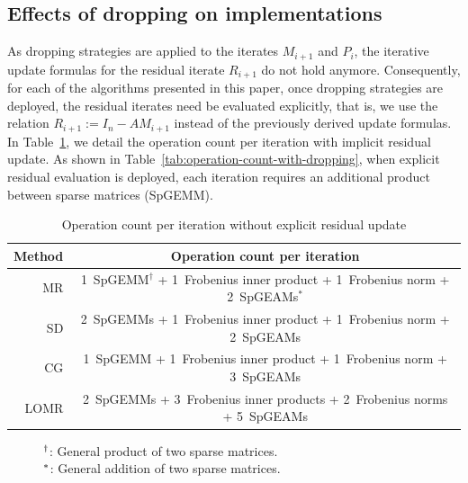 \documentclass[numbers,webpdf,imanum]{ima-authoring-template}%
\theoremstyle{thmstyletwo}%
\numberwithin{equation}{section}
\begin{document}
\subsection{Effects of dropping on implementations}
As dropping strategies are applied to the iterates $M_{i+1}$ and $P_i$, the iterative update formulas for the residual iterate $R_{i+1}$ do not hold anymore.
Consequently, for each of the algorithms presented in this paper, once dropping strategies are deployed, the residual iterates need be evaluated explicitly, that is, we use the relation $R_{i+1}:=I_n-AM_{i+1}$ instead of the previously derived update formulas.
In Table~\ref{tab:operation-count}, we detail the operation count per iteration with implicit residual update.
As shown in Table~\ref{tab:operation-count-with-dropping}, when explicit residual evaluation is deployed, each iteration requires an additional product between sparse matrices (SpGEMM).

\begin{table}
\caption{Operation count per iteration without explicit residual update}
\label{tab:operation-count}
\begin{tabular}{rc}
\toprule
Method & Operation count per iteration\\
\midrule
  MR & 1~SpGEMM${}^\dagger$\hphantom{s} + 1~Frobenius inner product\hphantom{s} + 1~Frobenius norm\hphantom{s} + 2~SpGEAMs${}^*$\\
  SD & 2~SpGEMMs\hphantom{${}^\dagger$}\hspace{.02cm} + 1~Frobenius inner product\hphantom{s} + 1~Frobenius norm\hphantom{s} + 2~SpGEAMs\hphantom{${}^*$}\\
  CG & 1~SpGEMM\hphantom{s}\hphantom{${}^\dagger$}\hspace{.02cm} + 1~Frobenius inner product\hphantom{s} + 1~Frobenius norm\hphantom{s} + 3~SpGEAMs\hphantom{${}^*$}\\
LOMR & 2~SpGEMMs\hphantom{${}^\dagger$}\hspace{.02cm} + 3~Frobenius inner products + 2~Frobenius norms + 5~SpGEAMs\hphantom{${}^*$}\\
\bottomrule
\end{tabular}
{\footnotesize$\hspace*{1cm}{}^\dagger$: General product of two sparse matrices.}\\
{\footnotesize$\hspace*{1cm}{}^*$: General addition of two sparse matrices.}
\end{table}
\end{document}
